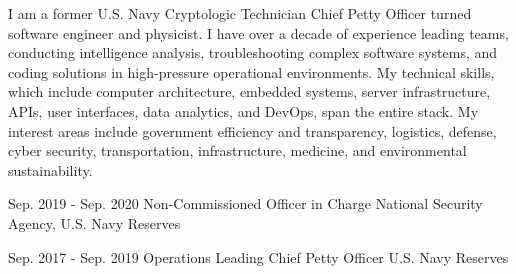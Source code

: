 \documentclass[11pt, a4paper]{cv}
\begin{document}
\begin{header}
\address{Brooklyn, NY}
\mobile{}
\makeheader[C]
\end{header}
\medskip
\begin{cv}
\begin{summary}
%
\begin{cvparagraph}
I am a former U.S. Navy Cryptologic Technician Chief Petty Officer turned software engineer and physicist. I have over a decade of experience leading teams, conducting intelligence analysis, troubleshooting complex software systems, and coding solutions in high-pressure operational environments. My technical skills, which include computer architecture, embedded systems, server infrastructure, APIs, user interfaces, data analytics, and DevOps, span the entire stack. My interest areas include government efficiency and transparency, logistics, defense, cyber security, transportation, infrastructure, medicine, and environmental sustainability.
\end{cvparagraph}
\end{summary}
\begin{experience}
%
\begin{cventries}
\cventry
{Sep. 2019 - Sep. 2020}
{Non-Commissioned Officer in Charge}
{National Security Agency, U.S. Navy Reserves}
{}
{\begin{cvitems}
%
%
%
%
%
%
\end{cvitems}}
\cventry
{Sep. 2017 - Sep. 2019}
{Operations Leading Chief Petty Officer}
{U.S. Navy Reserves}
{}
{\begin{cvitems}

\end{cvitems}}
\end{cventries}
\end{experience}
\end{cv}
\end{document}
